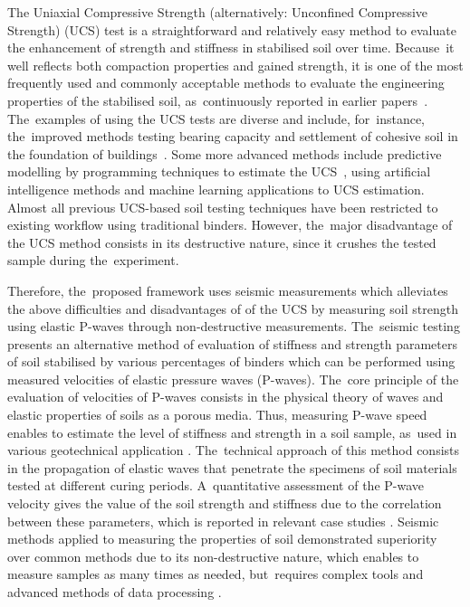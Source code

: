 \documentclass[materials,article,accept,pdftex,moreauthors]{Definitions/mdpi}
\begin{document}
{The Uniaxial Compressive Strength (alternatively: Unconfined Compressive Strength) (UCS) test is a straightforward and relatively easy method to evaluate the enhancement of strength and stiffness in stabilised soil over time. Because~it well reflects both compaction properties and gained strength, it is one of the most frequently used and commonly acceptable methods to evaluate the engineering properties of the stabilised soil, as~continuously reported in earlier papers~\cite{Eskisar,Feng,Rodriguez,Christensen}. The~examples of using the UCS tests are diverse and include, for~instance, the~improved methods testing bearing capacity and settlement of cohesive soil in the foundation of buildings~\cite{Alshkane}. Some more advanced methods include predictive modelling by programming techniques to estimate the UCS~\cite{Onyelowe}, using artificial intelligence methods \citep{Tabarsa,Sihag,Liuetal2015} and machine learning applications \citep{Furtney,Sihag} to UCS estimation. Almost all previous UCS-based soil testing techniques have been restricted to existing workflow using traditional binders. However, the~major disadvantage of the UCS method consists in its destructive nature, since it crushes the tested sample during the~experiment.

Therefore, the~proposed framework uses seismic measurements which alleviates the above difficulties and disadvantages of of the UCS by measuring soil strength using elastic P-waves through non-destructive measurements. The~seismic testing presents an alternative method of evaluation of stiffness and strength parameters of soil stabilised by various percentages of binders which can be performed using measured velocities of elastic pressure waves (P-waves). The~core principle of the evaluation of velocities of P-waves consists in the physical theory of waves and elastic properties of soils as a porous media. Thus, measuring P-wave speed enables to estimate the level of stiffness and strength in a soil sample, as~used in various geotechnical application \citep{Gheibi,Jiangetal2021,Jiangetal2017,LindhLemenkova2021b,Lacidogna}. The~technical approach of this method consists in the propagation of elastic waves that penetrate the specimens of soil materials tested at different curing periods. A~quantitative assessment of the P-wave velocity gives the value of the soil strength and stiffness due to the correlation between these parameters, which is reported in relevant case studies \citep{LindhLemenkova2022c,LinWang2020,Kurtulus,Ryden}. Seismic methods applied to measuring the properties of soil demonstrated superiority over common methods due to its non-destructive nature, which enables to measure samples as many times as needed, but~requires complex tools and advanced methods of data processing \citep{Sarro,Shietal2017}. 

}
\end{document}
